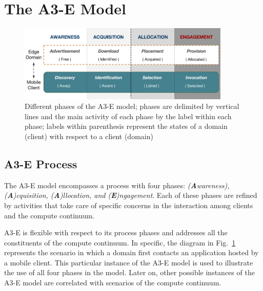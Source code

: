 \section{The A3-E Model}\label{sec:proposal}

\begin{figure}[tbp]
	\includegraphics[width=0.9\textwidth]{figs/A3-E.png}
	\caption{Different phases of the A3-E model; phases are delimited by vertical lines and the main activity of each phase by the label within each phase; labels within parenthesis represent the states of a domain (client) with respect to a client (domain)}
	\label{fig:A3-E-model}
\end{figure}

\subsection{A3-E Process}\label{sec:A3-E-process}

The A3-E model encompasses a process with four phases: \textit{(\textbf{A}wareness), (\textbf{A})cquisition, (\textbf{A})llocation, and (\textbf{E})ngagement}. Each of these phases are refined by activities that take care of specific concerns in the interaction among clients and the compute continuum.

A3-E is flexible with respect to its process phases and addresses all the constituents of the compute continuum. In specific, the diagram in Fig.~\ref{fig:A3-E-model} represents the scenario in which a domain first contacts an application hosted by a mobile client. This particular instance of the A3-E model is used to illustrate the use of all four phases in the model. Later on, other possible instances of the A3-E model are correlated with scenarios of the compute continuum.


